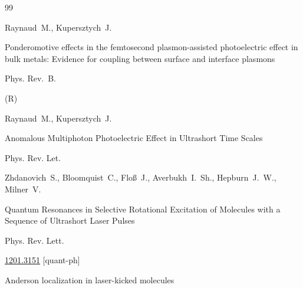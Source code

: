 \begin{thebibliography}{99}






\by Raynaud~M., Kupersztych~J. 

\paper Ponderomotive effects in the femtosecond plasmon-assisted photoelectric effect in bulk metals: Evidence for coupling between surface and interface plasmons 

\jour Phys. Rev.~B. 




(R)





\by Raynaud~M., Kupersztych~J.

\paper Anomalous Multiphoton Photoelectric Effect in Ultrashort Time Scales 

\jour Phys. Rev. Let. 









\by Zhdanovich~S., Bloomquist~C., Flo\ss~J.,  Averbukh~I.~Sh., Hepburn~J.~W., Milner~V.

\paper Quantum Resonances in Selective Rotational Excitation of Molecules with a Sequence of Ultrashort Laser Pulses 

\jour Phys. Rev. Lett.





\arxiv \href{http://arxiv.org/abs/1201.3151}{1201.3151} [quant-ph]





\paper Anderson localization in laser-kicked molecules 


\end{thebibliography}
